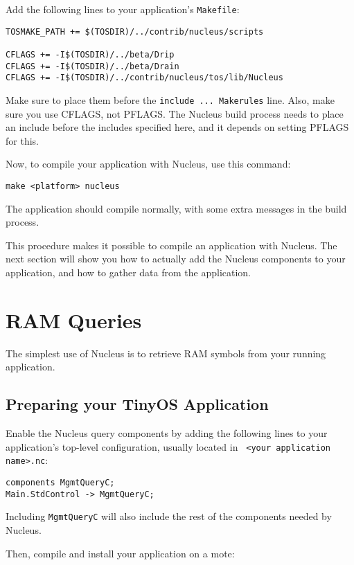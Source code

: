 \documentclass{article}
\begin{document}
Add the following lines to your application's {\tt Makefile}:

\begin{verbatim}
TOSMAKE_PATH += $(TOSDIR)/../contrib/nucleus/scripts

CFLAGS += -I$(TOSDIR)/../beta/Drip
CFLAGS += -I$(TOSDIR)/../beta/Drain
CFLAGS += -I$(TOSDIR)/../contrib/nucleus/tos/lib/Nucleus
\end{verbatim}

Make sure to place them before the {\tt include ... Makerules}
line. Also, make sure you use CFLAGS, not PFLAGS. The Nucleus build
process needs to place an include before the includes specified here,
and it depends on setting PFLAGS for this.

Now, to compile your application with Nucleus, use this command:

\begin{verbatim}
make <platform> nucleus
\end{verbatim}

The application should compile normally, with some extra messages in
the build process. 

This procedure makes it possible to compile an application with
Nucleus. The next section will show you how to actually add the
Nucleus components to your application, and how to gather data from
the application.

\newpage
\section{RAM Queries}

The simplest use of Nucleus is to retrieve RAM symbols from your
running application. 

\subsection{Preparing your TinyOS Application}

Enable the Nucleus query components by adding the following lines to
your application's top-level configuration, usually located in {\tt
<your application name>.nc}:

\begin{verbatim}
components MgmtQueryC;
Main.StdControl -> MgmtQueryC;
\end{verbatim}

Including {\tt MgmtQueryC} will also include the rest of the
components needed by Nucleus.

Then, compile and install your application on a mote:
\end{document}
